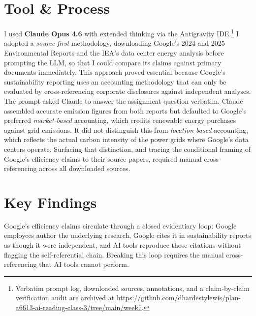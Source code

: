 \documentclass[11pt, twocolumn]{article}
\begin{document}

\section*{Tool \& Process}
I used \textbf{Claude Opus 4.6} with extended thinking via the Antigravity IDE.\footnote{Verbatim prompt log, downloaded sources, annotations, and a claim-by-claim verification audit are archived at \url{https://github.com/dhardestylewis/plan-a6613-ai-reading-class-3/tree/main/week7}.} I adopted a \textit{source-first} methodology, downloading Google's 2024 and 2025 Environmental Reports and the IEA's data center energy analysis before prompting the LLM, so that I could compare its claims against primary documents immediately. This approach proved essential because Google's sustainability reporting uses an accounting methodology that can only be evaluated by cross-referencing corporate disclosures against independent analyses. The prompt asked Claude to answer the assignment question verbatim. Claude assembled accurate emission figures from both reports but defaulted to Google's preferred \textit{market-based} accounting, which credits renewable energy purchases against grid emissions. It did not distinguish this from \textit{location-based} accounting, which reflects the actual carbon intensity of the power grids where Google's data centers operate. Surfacing that distinction, and tracing the conditional framing of Google's efficiency claims to their source papers, required manual cross-referencing across all downloaded sources.

\section*{Key Findings}
\noindent Google's efficiency claims circulate through a closed evidentiary loop: Google employees author the underlying research, Google cites it in sustainability reports as though it were independent, and AI tools reproduce those citations without flagging the self-referential chain. Breaking this loop requires the manual cross-referencing that AI tools cannot perform.
\end{document}
